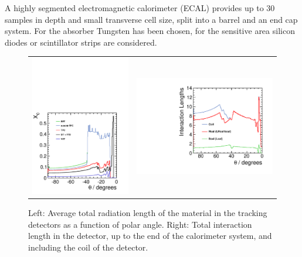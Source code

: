 A highly segmented electromagnetic calorimeter (ECAL) provides up to 30 samples in depth and small transverse cell size, split into a barrel and an end cap system. For the absorber Tungsten has been chosen, for the sensitive area silicon diodes or scintillator strips are considered.
\begin{figure}[t!]
\begin{tabular}{cc}
\includegraphics[width=0.52\hsize,viewport={0 -10 600 500},clip]{Introduction/fig/material-budget-new.pdf} &
\includegraphics[width=0.5\hsize]{Introduction/fig/intlen_ILD_o1_v05.pdf}
\end{tabular}
\caption[Material in the ILD detector]{Left: Average total radiation length of the material
  in the tracking detectors as a function of polar angle. Right: Total interaction length in the detector, up to the end of the calorimeter system, and including the coil of the detector.}
\label{fig:intro:material}

\end{figure}


